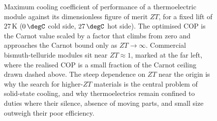 \begin{figure}[htbp]
\centering
{}
\caption[Thermoelectric cooling COP versus figure of merit]{Maximum cooling
coefficient of performance of a thermoelectric module against its dimensionless
figure of merit $ZT$, for a fixed lift of $27\,\mathrm{K}$ ($0\,\degC$ cold side,
$27\,\degC$ hot side). The optimised COP is the Carnot value scaled by a factor
that climbs from zero and approaches the Carnot bound only as $ZT \to \infty$.
Commercial bismuth-telluride modules sit near $ZT \approx 1$, marked at the far
left, where the realised COP is a small fraction of the Carnot ceiling drawn
dashed above. The steep dependence on $ZT$ near the origin is why the search for
higher-$ZT$ materials is the central problem of solid-state cooling, and why
thermoelectrics remain confined to duties where their silence, absence of moving
parts, and small size outweigh their poor efficiency.}
\label{fig:vol04ch03:thermoelectric-cop}
\end{figure}
